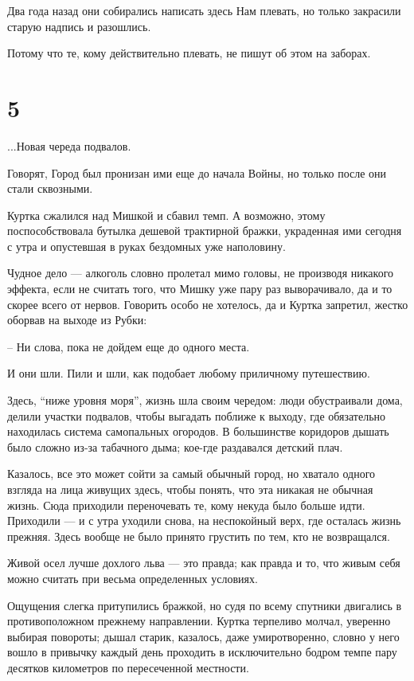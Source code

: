 \documentclass[a5paper]{article}
\begin{document}
Два года назад они собирались написать здесь Нам плевать, но только закрасили старую надпись и разошлись.

Потому что те, кому действительно плевать, не пишут об этом на заборах.

\section*{5}

...Новая череда подвалов.

Говорят, Город был пронизан ими еще до начала Войны, но только после они стали сквозными.

Куртка сжалился над Мишкой и сбавил темп. А возможно, этому поспособствовала бутылка дешевой трактирной бражки, украденная ими сегодня с утра и опустевшая в руках бездомных уже наполовину.

Чудное дело --- алкоголь словно пролетал мимо головы, не производя никакого эффекта, если не считать того, что Мишку уже пару раз выворачивало, да и то скорее всего от нервов. Говорить особо не хотелось, да и Куртка запретил, жестко оборвав на выходе из Рубки:

-- Ни слова, пока не дойдем еще до одного места.

И они шли. Пили и шли, как подобает любому приличному путешествию.

Здесь, “ниже уровня моря”, жизнь шла своим чередом: люди обустраивали дома, делили участки подвалов, чтобы выгадать поближе к выходу, где обязательно находилась система самопальных огородов. В большинстве коридоров дышать было сложно из-за табачного дыма; кое-где раздавался детский плач.

Казалось, все это может сойти за самый обычный город, но хватало одного взгляда на лица живущих здесь, чтобы понять, что эта никакая не обычная жизнь. Сюда приходили переночевать те, кому некуда было больше идти. Приходили --- и с утра уходили снова, на неспокойный верх, где осталась жизнь прежняя. Здесь вообще не было принято грустить по тем, кто не возвращался.

Живой осел лучше дохлого льва --- это правда; как правда и то, что живым себя можно считать при весьма определенных условиях.

Ощущения слегка притупились бражкой, но судя по всему спутники двигались в противоположном прежнему направлении. Куртка терпеливо молчал, уверенно выбирая повороты; дышал старик, казалось, даже умиротворенно, словно у него вошло в привычку каждый день проходить в исключительно бодром темпе пару десятков километров по пересеченной местности.
\end{document}
